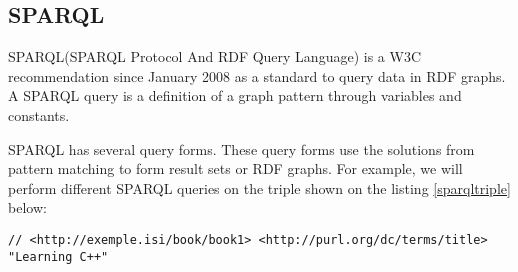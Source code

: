 \subsection{SPARQL}
SPARQL(SPARQL Protocol And RDF Query Language) \cite{SPARQL} is a W3C recommendation since January 2008 as a standard to query data in RDF graphs. A SPARQL query is a definition of a graph pattern through variables and constants. 

SPARQL has several query forms. These query forms use the solutions from pattern matching to form result sets or RDF graphs. 
For example, we will perform different SPARQL queries on the triple shown on the listing \ref{sparqltriple} below:

\begin{lstlisting}[captionpos=b, caption=Queried RDF triple, label={sparqltriple},
basicstyle=\footnotesize,frame=single]
// <http://exemple.isi/book/book1> <http://purl.org/dc/terms/title> "Learning C++"   
\end{lstlisting}

